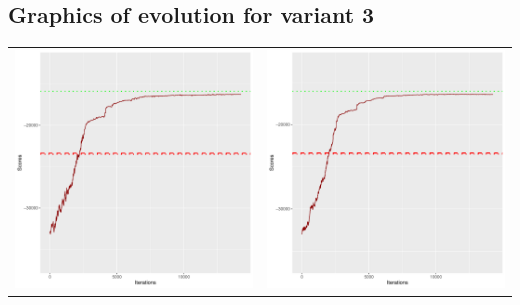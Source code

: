 \documentclass[]{scrartcl}
\begin{document}
\clearpage

\subsection{Graphics of evolution for variant 3}

\begin{table}[h!]
\begin{tabular}{cc}
\includegraphics[scale = 0.4]{./figs/win95pts/v3/25/boundsEvolution-14252.pdf} & 
\includegraphics[scale = 0.4]{./figs/win95pts/v3/50/boundsEvolution-14252.pdf} \\

\end{tabular}
\end{table}
\end{document}
